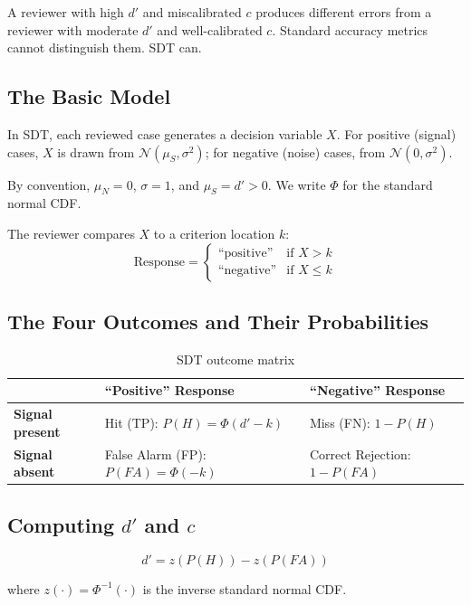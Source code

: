 A reviewer with high $d'$ and miscalibrated $c$ produces different errors from a reviewer with moderate $d'$ and well-calibrated $c$. Standard accuracy metrics cannot distinguish them. SDT can.

\subsection{The Basic Model}

In SDT, each reviewed case generates a decision variable $X$. For positive (signal) cases, $X$ is drawn from $\mathcal{N}(\mu_S, \sigma^2)$; for negative (noise) cases, from $\mathcal{N}(0, \sigma^2)$.

By convention, $\mu_N = 0$, $\sigma = 1$, and $\mu_S = d' > 0$. We write $\Phi$ for the standard normal CDF.

The reviewer compares $X$ to a criterion location $k$:
\[
\text{Response} = \begin{cases} \text{``positive''} & \text{if } X > k \\ \text{``negative''} & \text{if } X \leq k \end{cases}
\]

\subsection{The Four Outcomes and Their Probabilities}

\begin{table}[htbp]
\centering
\caption{SDT outcome matrix}
\label{tab:sdt-outcomes}
\small
\begin{tabularx}{\textwidth}{@{}lYY@{}}
\toprule
 & \textbf{``Positive'' Response} & \textbf{``Negative'' Response} \\
\midrule
\textbf{Signal present} & Hit (TP): $P(H) = \Phi(d' - k)$ & Miss (FN): $1 - P(H)$ \\
\textbf{Signal absent} & False Alarm (FP): $P(FA) = \Phi(-k)$ & Correct Rejection: $1 - P(FA)$ \\
\bottomrule
\end{tabularx}
\end{table}

\subsection{Computing $d'$ and $c$}

\[
d' = z(P(H)) - z(P(FA))
\]

where $z(\cdot) = \Phi^{-1}(\cdot)$ is the inverse standard normal CDF.

